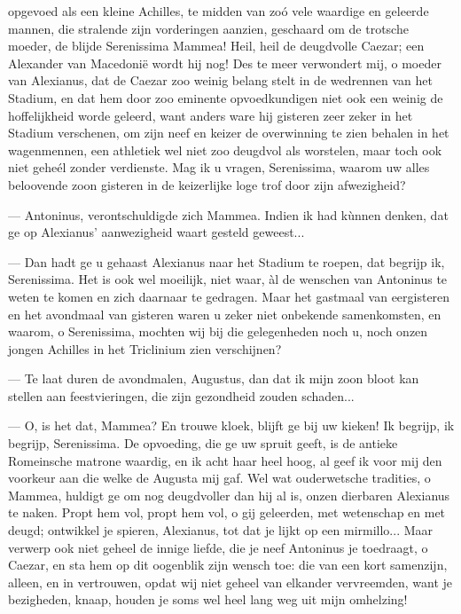 \documentclass[a4paper, 12pt, oneside, dutch]{article}
\begin{document}
opgevoed als een kleine Achilles, te midden van zoó vele waardige en geleerde mannen, die stralende zijn vorderingen aanzien, geschaard om de trotsche moeder, de blijde Serenissima Mammea! Heil, heil de deugdvolle Caezar; een Alexander van Macedonië wordt hij nog! Des te meer verwondert mij, o moeder van Alexianus, dat de Caezar zoo weinig belang stelt in de wedrennen van het Stadium, en dat hem door zoo eminente opvoedkundigen niet ook een weinig de hoffelijkheid worde geleerd, want anders ware hij gisteren zeer zeker in het Stadium verschenen, om zijn neef en keizer de overwinning te zien behalen in het wagenmennen, een athletiek wel niet zoo deugdvol als worstelen, maar toch ook niet geheél zonder verdienste. Mag ik u vragen, Serenissima, waarom uw alles beloovende zoon gisteren in de keizerlijke loge trof door zijn afwezigheid?

--- Antoninus, verontschuldigde zich Mammea. Indien ik had kùnnen denken, dat ge op Alexianus' aanwezigheid waart gesteld geweest...

--- Dan hadt ge u gehaast Alexianus naar het Stadium te roepen, dat begrijp ik, Serenissima. Het is ook wel moeilijk, niet waar, àl de wenschen van Antoninus te weten te komen en zich daarnaar te gedragen. Maar het gastmaal van eergisteren en het avondmaal van gisteren waren u zeker niet onbekende samenkomsten, en waarom, o Serenissima, mochten wij bij die gelegenheden noch u, noch onzen jongen Achilles in het Triclinium zien verschijnen?

--- Te laat duren de avondmalen, Augustus, dan dat ik mijn zoon bloot kan stellen aan feestvieringen, die zijn gezondheid zouden schaden...

--- O, is het dat, Mammea? En trouwe kloek, blijft ge bij uw kieken! Ik begrijp, ik begrijp, Serenissima. De opvoeding, die ge uw spruit geeft, is de antieke Romeinsche matrone waardig, en ik acht haar heel hoog, al geef ik voor mij den voorkeur aan die welke de Augusta mij gaf. Wel wat ouderwetsche tradities, o Mammea, huldigt ge om nog deugdvoller dan hij al is, onzen dierbaren Alexianus te naken. Propt hem vol, propt hem vol, o gij geleerden, met wetenschap en met deugd; ontwikkel je spieren, Alexianus, tot dat je lijkt op een mirmillo... Maar verwerp ook niet geheel de innige liefde, die je neef Antoninus je toedraagt, o Caezar, en sta hem op dit oogenblik zijn wensch toe: die van een kort samenzijn, alleen, en in vertrouwen, opdat wij niet geheel van elkander vervreemden, want je bezigheden, knaap, houden je soms wel heel lang weg uit mijn omhelzing!
\end{document}
